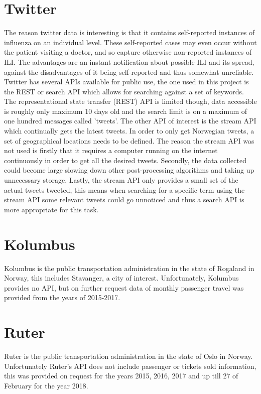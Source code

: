 \section{Twitter}
The reason twitter data is interesting is that it contains self-reported instances of influenza on an individual level. These self-reported cases may even occur without the patient visiting a doctor, and so capture otherwise non-reported instances of ILI. The advantages are an instant notification about possible ILI and its spread, against the disadvantages of it being self-reported and thus somewhat unreliable. Twitter has several APIs available for public use, the one used in this project is the REST or search API which allows for searching against a set of keywords. The representational state transfer (REST) API is limited though, data accessible is roughly only maximum 10 days old and the search limit is on a maximum of one hundred messages called 'tweets'. The other API of interest is the stream API which continually gets the latest tweets. In order to only get Norwegian tweets, a set of geographical locations needs to be defined. The reason the stream API was not used is firstly that it requires a computer running on the internet continuously in order to get all the desired tweets. Secondly, the data collected could become large slowing down other post-processing algorithms and taking up unnecessary storage. Lastly, the stream API only provides a small set of the actual tweets tweeted, this means when searching for a specific term using the stream API some relevant tweets could go unnoticed and thus a search API is more appropriate for this task.

\section{Kolumbus}
Kolumbus is the public transportation administration in the state of Rogaland in Norway, this includes Stavanger, a city of interest. Unfortunately, Kolumbus provides no API, but on further request data of monthly passenger travel was provided from the years of 2015-2017.

\section{Ruter}
Ruter is the public transportation administration in the state of Oslo in Norway. Unfortunately Ruter's API does not include passenger or tickets sold information, this was provided on request for the years 2015, 2016, 2017 and up till 27 of February for the year 2018.